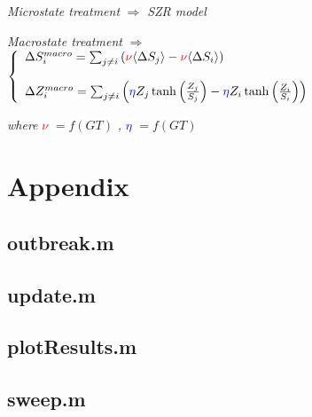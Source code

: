\documentclass[11pt]{article} %
\begin{document}
\bigskip

\textit{Microstate treatment} $\Rightarrow$ \textit{SZR model} 

\bigskip

\textit{Macrostate treatment} $\Rightarrow$  $\left\{
	\begin{array}{l l}
		\Delta S_{i}^{macro} =  \sum_{j\neq i}{ \left( \textcolor{red}{\nu} \langle \Delta S_{j} \rangle - \textcolor{red}{\nu}  \langle \Delta S_{i} \rangle \right) }	
    \\
    \\
    		\Delta Z_{i}^{macro} = \sum_{j\neq i}{\left( \textcolor{blue}{\eta} Z_{j}\tanh \left( \frac{Z_{j}}{S_{j}}\right) -\textcolor{blue}{\eta} Z_{i}\tanh \left( \frac{Z_{i}}{S_{i}}\right) \right)}

	\end{array} \right.$

\bigskip

\textit{where} \textcolor{red}{$\nu$} $= f(GT)$ \textit{,} \textcolor{blue}{$\eta$} $= f(GT)$  

\newpage

\nocite{bennett1995modelling, balcan2011phase, funk2010modelling, reluga2010game, reluga2009sis, munz2009zombies, drezner}

\newpage

\section{Appendix}
\bigskip
\subsection{outbreak.m}

\bigskip
\bigskip
\bigskip

\subsection{update.m}

\bigskip
\bigskip
\bigskip

\subsection{plotResults.m}

\bigskip
\bigskip
\bigskip

\subsection{sweep.m}

\end{document}
